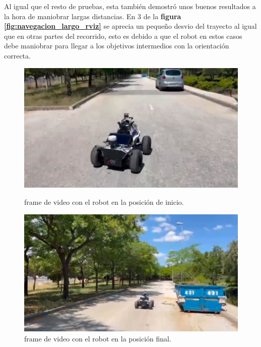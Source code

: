 Al igual que el resto de pruebas, esta también demostró unos buenos resultados a la hora de maniobrar largas distancias. En 3 de la \textbf{figura \ref{fig:navegacion_largo_rviz}} 
se aprecia un pequeño desvio del trayecto al igual que en otras partes del recorrido, esto es debido a que el robot en estos casos debe maniobrar para llegar a los objetivos intermedios con la orientación correcta.
\begin{figure}[htbp]
  \centering
  \begin{minipage}[b]{0.45\textwidth}
    \centering
    \includegraphics[width=\textwidth]{images/inicio_nav_larga.png}
    \caption{frame de video con el robot en la posición de inicio.}
    \label{fig:frame1_nav_largo}
  \end{minipage}
  \hfill
  \begin{minipage}[b]{0.45\textwidth}
    \centering
    \includegraphics[width=\textwidth]{images/final_nav_larga.png}
    \caption{frame de video con el robot en la posición final.}
    \label{fig:frame2_nav_largo}
  \end{minipage}
\end{figure}

